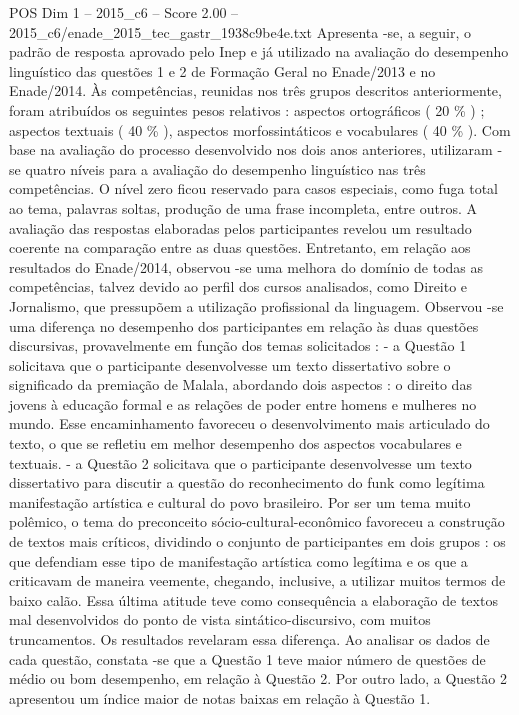 \begin{textsample}{POS Dim 1 – 2015\_c6 – Score 2.00 – 2015\_c6/enade\_2015\_tec\_gastr\_1938c9be4e.txt}
Apresenta -se, a seguir, o padrão de resposta aprovado pelo Inep e já utilizado na avaliação do desempenho linguístico das questões 1 e 2 de Formação Geral no Enade/2013 e no Enade/2014.
Às competências, reunidas nos três grupos descritos anteriormente, foram atribuídos os seguintes pesos relativos : aspectos ortográficos ( 20 \% ) ; aspectos textuais ( 40 \% ), aspectos morfossintáticos e vocabulares ( 40 \% ).
Com base na avaliação do processo desenvolvido nos dois anos anteriores, utilizaram -se quatro níveis para a avaliação do desempenho linguístico nas três competências.
O nível zero ficou reservado para casos especiais, como fuga total ao tema, palavras soltas, produção de uma frase incompleta, entre outros.
A avaliação das respostas elaboradas pelos participantes revelou um resultado coerente na comparação entre as duas questões.
Entretanto, em relação aos resultados do Enade/2014, observou -se uma melhora do domínio de todas as competências, talvez devido ao perfil dos cursos analisados, como Direito e Jornalismo, que pressupõem a utilização profissional da linguagem.
Observou -se uma diferença no desempenho dos participantes em relação às duas questões discursivas, provavelmente em função dos temas solicitados : - a Questão 1 solicitava que o participante desenvolvesse um texto dissertativo sobre o significado da premiação de Malala, abordando dois aspectos : o direito das jovens à educação formal e as relações de poder entre homens e mulheres no mundo.
Esse encaminhamento favoreceu o desenvolvimento mais articulado do texto, o que se refletiu em melhor desempenho dos aspectos vocabulares e textuais. - a Questão 2 solicitava que o participante desenvolvesse um texto dissertativo para discutir a questão do reconhecimento do funk como legítima manifestação artística e cultural do povo brasileiro.
Por ser um tema muito polêmico, o tema do preconceito sócio-cultural-econômico favoreceu a construção de textos mais críticos, dividindo o conjunto de participantes em dois grupos : os que defendiam esse tipo de manifestação artística como legítima e os que a criticavam de maneira veemente, chegando, inclusive, a utilizar muitos termos de baixo calão.
Essa última atitude teve como consequência a elaboração de textos mal desenvolvidos do ponto de vista sintático-discursivo, com muitos truncamentos.
Os resultados revelaram essa diferença.
Ao analisar os dados de cada questão, constata -se que a Questão 1 teve maior número de questões de médio ou bom desempenho, em relação à Questão 2.
Por outro lado, a Questão 2 apresentou um índice maior de notas baixas em relação à Questão 1.

\end{textsample}
